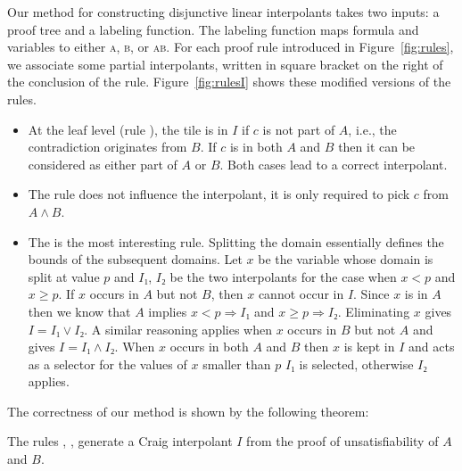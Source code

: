 Our method for constructing disjunctive linear interpolants takes two inputs: a proof tree and a labeling function. The labeling function maps formula and variables to either \textsc{a}, \textsc{b}, or \textsc{ab}.
For each proof rule introduced in Figure~\ref{fig:rules}, we associate some partial interpolants, written in square bracket on the right of the conclusion of the rule. 
Figure~\ref{fig:rulesI} shows these modified versions of the rules.
\begin{itemize}
\item At the leaf level (rule \thLemI), the tile is in $I$ if $c$ is not part of $A$, i.e., the contradiction originates from $B$.
If $c$ is in both $A$ and $B$ then it can be considered as either part of $A$ or $B$.
Both cases lead to a correct interpolant.

\item The \weakenI rule does not influence the interpolant, it is only required to pick $c$ from $A ∧ B$.

\item The \spltI is the most interesting rule.
Splitting the domain essentially defines the bounds of the subsequent domains.
Let $x$ be the variable whose domain is split at value $p$ and $I₁$, $I₂$ be the two interpolants for the case when $x < p$ and $x ≥ p$.
If $x$ occurs in $A$ but not $B$, then $x$ cannot occur in $I$.
Since $x$ is in $A$ then we know that $A$ implies $x < p ⇒ I₁$ and $x ≥ p ⇒ I₂$.
Eliminating $x$ gives $I = I₁ ∨ I₂$.
A similar reasoning applies when $x$ occurs in $B$ but not $A$ and gives $I = I₁ ∧ I₂$.
When $x$ occurs in both $A$ and $B$ then $x$ is kept in $I$ and acts as a selector for the values of $x$ smaller than $p$ $I₁$ is selected, otherwise $I₂$ applies.
\end{itemize}
The correctness of our method is shown by the following theorem:
\begin{theorem}
The rules \spltI, \thLemI, \weakenI generate a Craig interpolant $I$ from the proof of unsatisfiability of $A$ and $B$.
\label{thm:sound}
\end{theorem}
